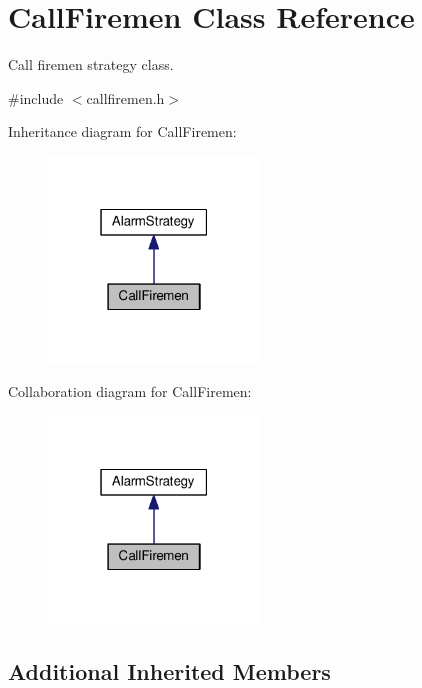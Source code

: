 \hypertarget{classCallFiremen}{}\section{Call\+Firemen Class Reference}
\label{classCallFiremen}


Call firemen strategy class.  




{\ttfamily \#include $<$callfiremen.\+h$>$}



Inheritance diagram for Call\+Firemen\+:\nopagebreak
\begin{figure}[H]
\begin{center}
\leavevmode
\includegraphics[width=159pt]{classCallFiremen__inherit__graph}
\end{center}
\end{figure}


Collaboration diagram for Call\+Firemen\+:\nopagebreak
\begin{figure}[H]
\begin{center}
\leavevmode
\includegraphics[width=159pt]{classCallFiremen__coll__graph}
\end{center}
\end{figure}
\subsection*{Additional Inherited Members}


